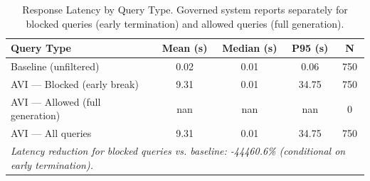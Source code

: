 \begin{table}[H]
\caption{Response Latency by Query Type. Governed system reports separately for
blocked queries (early termination) and allowed queries (full generation).
\label{tab:latency}}
\begin{tabular}{lcccc}
\toprule
\textbf{Query Type} & \textbf{Mean (s)} & \textbf{Median (s)} & \textbf{P95 (s)} & \textbf{N} \\
\midrule
Baseline (unfiltered) & 0.02 & 0.01 & 0.06 & 750 \\
AVI — Blocked (early break) & 9.31 & 0.01 & 34.75 & 750 \\
AVI — Allowed (full generation) & nan & nan & nan & 0 \\
AVI — All queries & 9.31 & 0.01 & 34.75 & 750 \\
\midrule
\multicolumn{5}{l}{\textit{Latency reduction for blocked queries vs. baseline: -44460.6\% (conditional on early termination).}} \\
\bottomrule
\end{tabular}
\end{table}